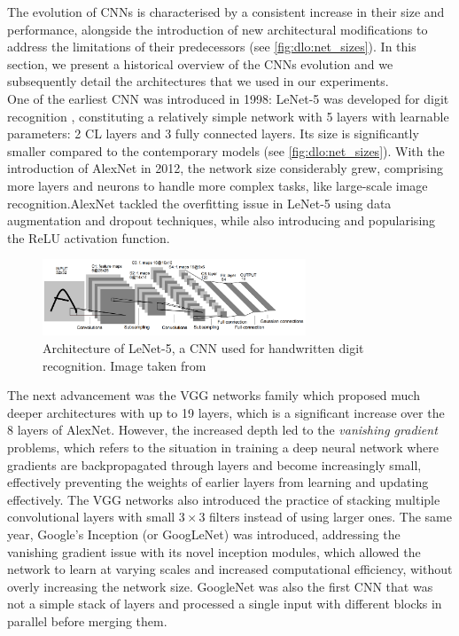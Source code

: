 The evolution of \aclp{CNN} is characterised by a consistent increase in their
size and performance, alongside the introduction of new architectural
modifications to address the limitations of their predecessors (see
\cref{fig:dlo:net_sizes}). In this section, we present a historical overview of
the \acp{CNN} evolution and we subsequently detail the architectures that we
used in our experiments.\\

One of the earliest \ac{CNN} was introduced in 1998: LeNet-5 was developed for
digit recognition \cite{DBLP:journals/pieee/LeCunBBH98}, constituting a
relatively simple network with 5 layers with learnable parameters: 2 \ac{CL}
layers and 3 fully connected layers. Its size is significantly smaller compared
to the contemporary models (see \cref{fig:dlo:net_sizes}). With the introduction
of AlexNet \cite{DBLP:conf/nips/KrizhevskySH12} in 2012, the network size
considerably grew, comprising more layers and neurons to handle more complex
tasks, like large-scale image recognition.AlexNet tackled the overfitting
issue in LeNet-5 using data augmentation and dropout techniques, while also
introducing and popularising the \ac{ReLU} activation function.\\

\begin{figure}[htbp]
  \centering
  \includegraphics[width=0.70\textwidth]{chapter_sota/assets/lenet.png}
  \caption{Architecture of LeNet-5, a \acl{CNN} used for handwritten digit
    recognition. Image taken from \cite{DBLP:journals/pieee/LeCunBBH98}}
  \label{fig:dlo:lenet5}
\end{figure}


The next advancement was the VGG networks family
\cite{DBLP:journals/corr/SimonyanZ14a} %
which proposed much deeper architectures with up to 19 layers, which is a
significant increase over the 8 layers of AlexNet. However, the increased depth
led to the \emph{vanishing gradient} problems, which refers to the situation in
training a deep neural network where gradients are backpropagated through layers
and become increasingly small, effectively preventing the weights of earlier
layers from learning and updating effectively. The VGG networks also introduced
the practice of stacking multiple convolutional layers with small $3\times 3$
filters instead of using larger ones. The same year, Google's Inception (or
GoogLeNet) \cite{DBLP:conf/cvpr/SzegedyLJSRAEVR15} was introduced, addressing
the vanishing gradient issue with its novel inception modules, which allowed
the network to learn at varying scales and increased computational efficiency,
without overly increasing the network size. GoogleNet was also the first
\ac{CNN} that was not a simple stack of layers and processed a single input with
different blocks in parallel before merging them.\\


